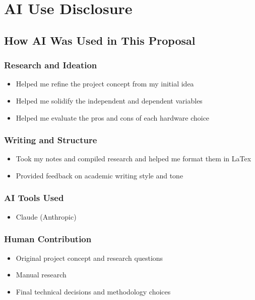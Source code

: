 \documentclass[12pt,letterpaper]{article}
\begin{document}
\newpage



\newpage
\appendix


\section{AI Use Disclosure}

\subsection{How AI Was Used in This Proposal}

\subsubsection{Research and Ideation}
\begin{itemize}
    \item Helped me refine the project concept from my initial idea
    \item Helped me solidify the independent and dependent variables
    \item Helped me evaluate the pros and cons of each hardware choice
\end{itemize}

\subsubsection{Writing and Structure}
\begin{itemize}
    \item Took my notes and compiled research and helped me format them in LaTex
    \item Provided feedback on academic writing style and tone
\end{itemize}

\subsubsection{AI Tools Used}
\begin{itemize}
    \item Claude (Anthropic) 
\end{itemize}

\subsubsection{Human Contribution}
\begin{itemize}
    \item Original project concept and research questions
    \item Manual research
    \item Final technical decisions and methodology choices
\end{itemize}
\end{document}
